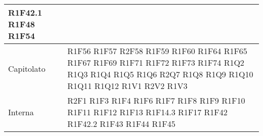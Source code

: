 \begin{center}
\begin{longtable}{|p{44mm}|p{22mm}|}
R1F42.1 \newline
R1F48 \newline
R1F54
\\
\hline
Capitolato &R1F56 \newline
R1F57 \newline
R2F58 \newline
R1F59 \newline
R1F60 \newline
R1F64 \newline
R1F65 \newline
R1F67 \newline
R1F69 \newline
R1F71 \newline
R1F72 \newline
R1F73 \newline
R1F74 \newline
R1Q2 \newline
R1Q3 \newline
R1Q4 \newline
R1Q5 \newline
R1Q6 \newline
R2Q7 \newline
R1Q8 \newline
R1Q9 \newline
R1Q10 \newline
R1Q11 \newline
R1Q12 \newline
R1V1 \newline
R2V2 \newline
R1V3 
\\
\hline
Interna &
R2F1 \newline
R1F3 \newline
R1F4 \newline
R1F6 \newline
R1F7 \newline
R1F8 \newline
R1F9 \newline
R1F10 \newline
R1F11 \newline
R1F12 \newline
R1F13 \newline
R1F14.3 \newline
R1F17 \newline
R1F42 \newline
R1F42.2 \newline
R1F43 \newline
R1F44 \newline
R1F45 \newline

\end{longtable}
\end{center}
